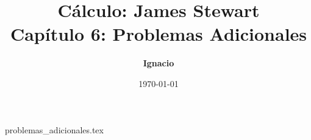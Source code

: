 \documentclass[11pt,spanish,oneside]{report}
\title{\textbf{Cálculo: James Stewart} \\ \Large Capítulo 6: Problemas Adicionales}
\author{\textbf{Ignacio}}
\date{\today}
\begin{document}
\maketitle

{problemas_adicionales.tex}
\end{document}
